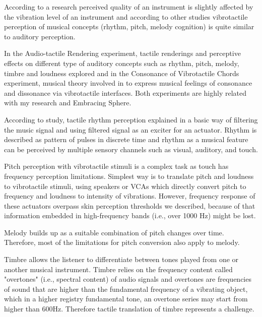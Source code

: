             According to a research\cite{Perceived_Quality_with_Vibration_of_Electric_Cello} perceived quality of an instrument is slightly affected by the vibration level of an instrument and according to other studies\cite{Consonance_of_Vibrotactile_Chords}\cite{Audio-Tactile_Rendering} vibrotactile perception of musical concepts (rhythm, pitch, melody cognition) is quite similar to auditory perception.\par

            In the Audio-tactile Rendering experiment\cite{Audio-Tactile_Rendering}, tactile renderings and perceptive effects on different type of auditory concepts such as rhythm, pitch, melody, timbre and loudness explored and in the Consonance of Vibrotactile Chords experiment\cite{Consonance_of_Vibrotactile_Chords}, musical theory involved in to express musical feelings of consonance and dissonance via vibrotactile interfaces. Both experiments are highly related with my research and Embracing Sphere.

            According to study\cite{Audio-Tactile_Rendering}, tactile rhythm perception explained in a basic way of filtering the music signal and using filtered signal as an exciter for an actuator. Rhythm is described as pattern of pulses in discrete time and rhythm as a musical feature can be perceived by multiple sensory channels such as visual, auditory, and touch.\par

            Pitch perception with vibrotactile stimuli is a complex task as touch has frequency perception limitations. Simplest way is to translate pitch and loudness to vibrotactile stimuli, using speakers or VCAs which directly convert pitch to frequency and loudness to intensity of vibrations. However, frequency response of these actuators overpass skin perception thresholds we described, because of that information embedded in high-frequency bands (i.e., over 1000 Hz) might be lost.\par

            Melody builds up as a suitable combination of pitch changes over time. Therefore, most of the limitations for pitch conversion also apply to melody.\par

            Timbre allows the listener to differentiate between tones played from one or another musical instrument. Timbre relies on the frequency content called "overtones" (i.e., spectral content) of audio signals and overtones are frequencies of sound that are higher than the fundamental frequency of a vibrating object, which in a higher registry fundamental tone, an overtone series may start from higher than 600Hz. Therefore tactile translation of timbre represents a challenge.\par

